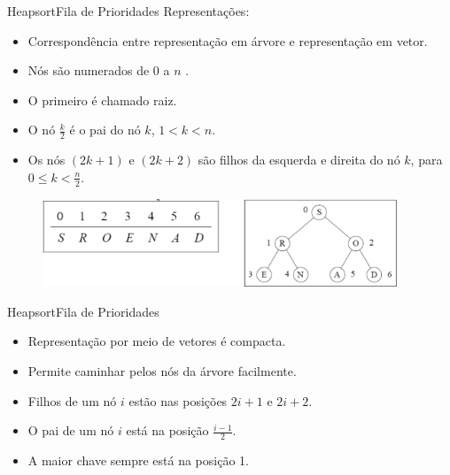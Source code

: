 \documentclass[aspectratio=169]{beamer}
\begin{document}
\begin{frame}{Heapsort}{Fila de Prioridades}
Representações:
\begin{itemize}
\item Correspondência entre representação em árvore e representação em vetor.
\item Nós são numerados de 0 a $n$ .
\item O primeiro é chamado raiz.
\item O nó $\frac{k}{2}$ é o pai do nó $k$, $1 < k < n$.
\item Os nós $(2k+1)$ e $(2k+2)$ são filhos da esquerda e direita do nó $k$, para $0 \leq k < \frac{n}{2}$.
\end{itemize}

\begin{figure}[!h]
  \centering
  \includegraphics[width=300pt]{imgs/representacao_fila_prioridade1.png}
  \label{fig_representacao_fila_prioridade1}
\end{figure}
\end{frame}


\begin{frame}{Heapsort}{Fila de Prioridades}
\begin{itemize}
\item Representação por meio de vetores é compacta.
\item Permite caminhar pelos nós da árvore facilmente.
\item Filhos de um nó $i$ estão nas posições $2i+1$ e $2i + 2$.
\item O pai de um nó $i$ está na posição $\frac{i-1}{2}$.
\item A maior chave sempre está na posição 1.
\end{itemize}
\end{frame}

\end{document}
